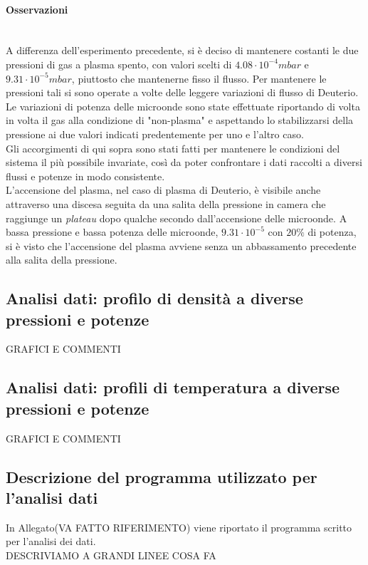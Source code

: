 \paragraph{Osservazioni} ~\\
A differenza dell'esperimento precedente, si è deciso di mantenere costanti le due pressioni di gas a plasma spento, con valori scelti di $4.08\cdot10^{-4}mbar$ e $9.31\cdot10^{-5}mbar$,
piuttosto che mantenerne fisso il flusso. 
Per mantenere le pressioni tali si sono operate a volte delle leggere variazioni di flusso di Deuterio.\\
Le variazioni di potenza delle microonde sono state effettuate riportando di volta in volta il gas alla condizione di "non-plasma" e aspettando lo stabilizzarsi della pressione ai due valori
indicati predentemente per uno e l'altro caso.\\
Gli accorgimenti di qui sopra sono stati fatti per mantenere le condizioni del sistema il più possibile invariate, così da poter confrontare i dati raccolti a diversi flussi e potenze in modo consistente.\\
L'accensione del plasma, nel caso di plasma di Deuterio, è visibile anche attraverso una discesa seguita da una salita della pressione in camera che raggiunge un \textit{plateau} dopo qualche secondo dall'accensione delle microonde.
A bassa pressione e bassa potenza delle microonde, $9.31\cdot10^{-5}$ con $20\%$ di potenza, si è visto che l'accensione del plasma avviene senza un abbassamento precedente alla salita della pressione.

\subsection{Analisi dati: profilo di densità a diverse pressioni e potenze}

GRAFICI E COMMENTI
\subsection{Analisi dati: profili di temperatura a diverse pressioni e potenze}

GRAFICI E COMMENTI

\subsection{Descrizione del programma utilizzato per l'analisi dati}
In Allegato(VA FATTO RIFERIMENTO) viene riportato il programma scritto per l'analisi dei dati.\\
DESCRIVIAMO A GRANDI LINEE COSA FA



